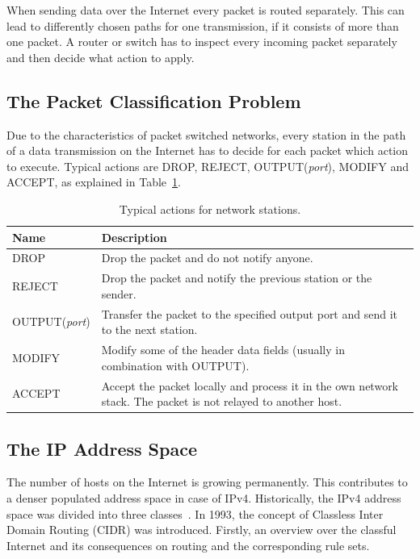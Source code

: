 \documentclass[a4paper,
		12pt,
		parskip=full,
		titlepage
		]{scrartcl}
\begin{document}
When sending data over the Internet every packet is routed separately.
This can lead to differently chosen paths for one transmission, if it consists of more than one packet.
A router or switch has to inspect every incoming packet separately and then decide what action to apply.

\subsection{The Packet Classification Problem}
Due to the characteristics of packet switched networks, every station in the path of a data transmission on the Internet 
has to decide for each packet which action to execute.
Typical actions are DROP, REJECT, OUTPUT(\textit{port}), MODIFY and ACCEPT, as explained in Table~\ref{table:actions}.

\begin{table}
  \centering
  \begin{tabularx}{\textwidth}{l|X}
  Name&Description\\
  \hline
  DROP&Drop the packet and do not notify anyone.\\
  REJECT&Drop the packet and notify the previous station or the sender.\\
  OUTPUT(\textit{port})&Transfer the packet to the specified output port and send it to the next station.\\
  MODIFY&Modify some of the header data fields (usually in combination with OUTPUT).\\
  ACCEPT&Accept the packet locally and process it in the own network stack. The packet is not relayed to another host.\\
  \end{tabularx}
  \caption{Typical actions for network stations.}
  \label{table:actions}
\end{table}

\subsection{The IP Address Space}
The number of hosts on the Internet is growing permanently.
This contributes to a denser populated address space in case of IPv4.
Historically, the IPv4 address space was divided into three classes~\cite{rfc1466}.
In 1993, the concept of Classless Inter Domain Routing (CIDR) was introduced.
Firstly, an overview over the classful Internet and its consequences on routing and the corresponding rule sets.
\end{document}
